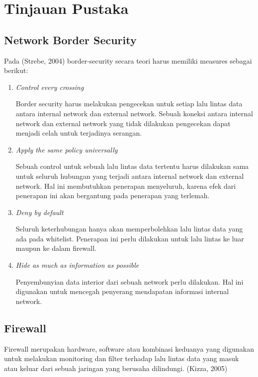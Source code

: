 \chapter{Tinjauan Pustaka}

\section{Network Border Security}
Pada (Strebe, 2004) border-security secara teori harus memiliki measures sebagai
berikut:
\begin{enumerate}
	\item \textit{Control every crossing}
	
	Border security harus melakukan pengecekan untuk setiap lalu lintas data antara internal network dan external network. Sebuah koneksi antara internal network dan external network yang tidak dilakukan pengecekan
	dapat menjadi celah untuk terjadinya serangan.
	
	\item \textit{Apply the same policy universally}
	
	Sebuah control untuk sebuah lalu lintas data tertentu harus dilakukan sama untuk seluruh hubungan yang terjadi antara internal network dan external network. Hal ini membutuhkan penerapan menyeluruh, karena efek dari penerapan ini akan bergantung pada penerapan yang terlemah.
	
	\item \textit{Deny by default}
	
	Seluruh keterhubungan hanya akan memperbolehkan lalu lintas data yang ada pada whitelist. Penerapan ini perlu dilakukan untuk lalu lintas ke luar	maupun ke dalam firewall.
	
	\item \textit{Hide as much as information as possible}
	
	Penyembunyian data interior dari sebuah network perlu dilakukan. Hal ini digunakan untuk mencegah penyerang mendapatan informasi internal network.
	
\end{enumerate}

\section{Firewall}
Firewall merupakan hardware, software atau kombinasi keduanya yang digunakan untuk melakukan monitoring dan filter terhadap lalu lintas data yang masuk atau keluar dari sebuah jaringan yang berusaha dilindungi. (Kizza, 2005)

